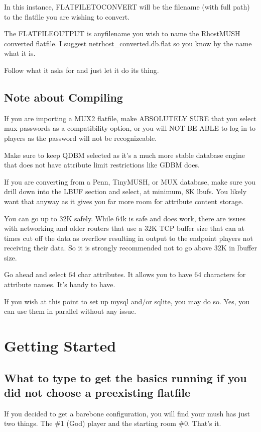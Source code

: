 \documentclass[letterpaper,10pt,english]{sphinxmanual}
\begin{document}
\sphinxAtStartPar
In this instance, FLATFILETOCONVERT will be the filename (with full path) to
the flatfile you are wishing to convert.

\sphinxAtStartPar
The FLATFILEOUTPUT is anyfilename you wish to name the RhostMUSH converted
flatfile.  I suggest netrhost\_converted.db.flat so you know by the name
what it is.

\sphinxAtStartPar
Follow what it asks for and just let it do its thing.


\section{Note about Compiling}
\label{\detokenize{database:note-about-compiling}}
\sphinxAtStartPar
If you are importing a MUX2 flatfile, make ABSOLUTELY SURE that you select
mux passwords as a compatibility option, or you will NOT BE ABLE to log in
to players as the password will not be recognizeable.

\sphinxAtStartPar
Make sure to keep QDBM selected as it’s a much more stable database engine
that does not have attribute limit restrictions like GDBM does.

\sphinxAtStartPar
If you are converting from a Penn, TinyMUSH, or MUX database, make sure you
drill down into the LBUF section and select, at minimum, 8K lbufs.  You likely
want that anyway as it gives you far more room for attribute content storage.

\sphinxAtStartPar
You can go up to 32K safely.  While 64k is safe and does work, there are issues
with networking and older routers that use a 32K TCP buffer size that can
at times cut off the data as overflow resulting in output to the end\sphinxhyphen{}point
players not receiving their data.  So it is strongly recommended not to go
above 32K in lbuffer size.

\sphinxAtStartPar
Go ahead and select 64 char attributes.  It allows you to have 64 characters
for attribute names.  It’s handy to have.

\sphinxAtStartPar
If you wish at this point to set up mysql and/or sqlite, you  may do so.
Yes, you can use them in parallel without any issue.


\chapter{Getting Started}
\label{\detokenize{gettingstarted:getting-started}}\label{\detokenize{gettingstarted::doc}}

\section{What to type to get the basics running if you did not choose a pre\sphinxhyphen{}existing flatfile}
\label{\detokenize{gettingstarted:what-to-type-to-get-the-basics-running-if-you-did-not-choose-a-pre-existing-flatfile}}
\sphinxAtStartPar
If you decided to get a bare\sphinxhyphen{}bone configuration, you will find your mush has just two things.  The \#1 (God) player and the starting room \#0.  That’s it.
\end{document}
